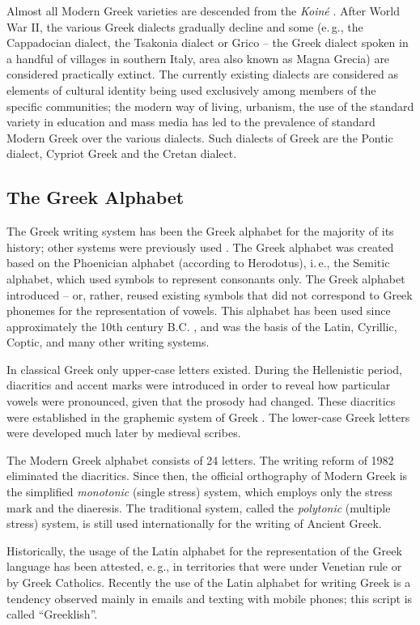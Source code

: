 \begin{multicols}{2}
Almost all Modern Greek varieties are descended from the \textit{Koiné} \cite{Bro1}. After World War II, the various Greek dialects gradually decline and some (e.\,g., the Cappadocian dialect, the Tsakonia dialect or Grico -- the Greek dialect spoken in a handful of villages in southern Italy, area also known as Magna Grecia) are considered practically extinct. The currently existing dialects are considered as elements of cultural identity being used exclusively among members of the specific communities; the modern way of living, urbanism, the use of the standard variety in education and mass media has led to the prevalence of standard Modern Greek over the various dialects. Such dialects of Greek are the Pontic dialect, Cypriot Greek and the Cretan dialect.

\subsection{The Greek Alphabet}

The Greek writing system has been the Greek alphabet for the majority of its history; other systems were previously used \cite{Kopi1}. The Greek alphabet was created based on the Phoenician alphabet (according to Herodotus), i.\,e., the Semitic alphabet, which used symbols to represent consonants only. The Greek alphabet introduced – or, rather, reused existing symbols that did not correspond to Greek phonemes for the representation of vowels. This alphabet has been used since approximately the 10th century B.C. \cite{Tonn1}, and was the basis of the Latin, Cyrillic, Coptic, and many other writing systems.

In classical Greek only upper-case letters existed. During the Hellenistic period, diacritics and accent marks were introduced in order to reveal how particular vowels were pronounced, given that the prosody had changed. These diacritics were established in the graphemic system of Greek \cite{Chris1}. The lower-case Greek letters were developed much later by medieval scribes.

The Modern Greek alphabet consists of 24 letters. The writing reform of 1982 eliminated the diacritics. Since then, the official orthography of Modern Greek is the simplified \textit{monotonic} (single stress) system, which employs only the stress mark and the diaeresis. The traditional system, called the \textit{polytonic} (multiple stress) system, is still used internationally for the writing of Ancient Greek.

Historically, the usage of the Latin alphabet for the representation of the Greek language has been attested, e.\,g., in territories that were under Venetian rule or by Greek Catholics. Recently the use of the Latin alphabet for writing Greek is a tendency observed mainly in emails and texting with mobile phones; this script is called “Greeklish”.


\end{multicols}
